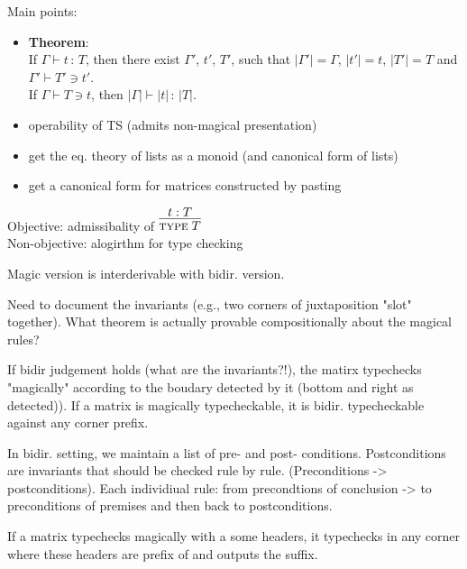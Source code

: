 \documentclass[12pt, a4paper]{article}
\newcommand{\Type}{\textsc{type}\;}
\newcommand{\gp}{\,}
\newcommand{\hasType}[3]{{#1} \vdash {#2} \hab {#3}}
\newcommand{\checkType}[2]{{#1} \ni {#2}}
\newcommand{\derad}[1]{|{#1}|}
\newcommand{\hab}{\gp : \gp}
\begin{document}
Main points:
\begin{itemize}
\item \textbf{Theorem}:\\
  If $\hasType{\Gamma}{t}{T}$, then there exist $\Gamma'$, $t'$, $T'$,
  such that $\derad{\Gamma'}= \Gamma$, $\derad{t'} = t$,
  $\derad{T'} = T$ and $\Gamma' \vdash \checkType{T'}{t'}$. \\

  If $\Gamma \vdash \checkType{T}{t}$, then
  $\hasType{\derad{\Gamma}}{\derad{t}}{\derad{T}}$.

\item operability of TS (admits non-magical presentation)
\item get the eq. theory of lists as a monoid (and canonical form of lists)
\item get a canonical form for matrices constructed by pasting
\end{itemize}
Objective: admissibality of $\infer{\Type T}{t : T}$\\
Non-objective: alogirthm for type checking

Magic version is interderivable with bidir. version.

Need to document the invariants (e.g., two corners of juxtaposition "slot" together).
What theorem is actually provable compositionally about the magical rules?

If bidir judgement holds (what are the invariants?!), the matirx typechecks "magically" according to the boudary detected by it (bottom and right as detected)).
If a matrix is magically typecheckable, it is bidir. typecheckable against any corner prefix.

In bidir. setting, we maintain a list of pre- and post- conditions.
Postconditions are invariants that should be checked rule by rule.
(Preconditions -> postconditions).
Each individiual rule: from precondtions of conclusion -> to preconditions of premises and then back to postconditions.

If a matrix typechecks magically with a some headers, it typechecks in any corner where these headers are prefix of and outputs the suffix.
\end{document}
